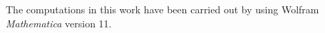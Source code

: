 \documentclass[a4paper]{article}
\newcommand{\dt}{\Delta t}
\newcommand{\dx}{\Delta x}
\begin{document}
The computations in this work have been carried out by using Wolfram \textit{Mathematica} version 11.








\end{document}
